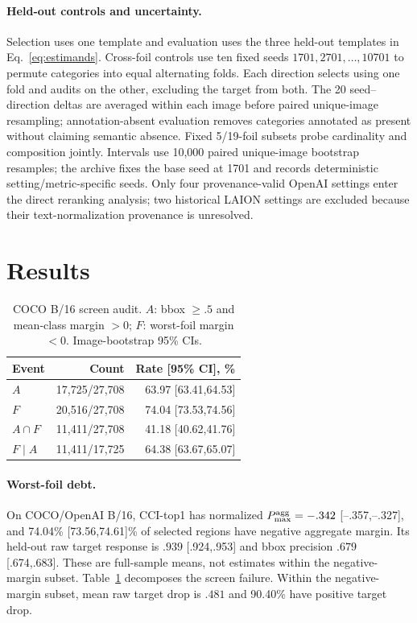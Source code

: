 \documentclass[10pt]{article}
\begin{document}
\paragraph{Held-out controls and uncertainty.}
Selection uses one template and evaluation uses the three held-out templates in
Eq.~\ref{eq:estimands}. Cross-foil controls use ten fixed seeds
$1701,2701,\ldots,10701$ to permute categories into equal alternating folds.
Each direction selects using one fold and audits on the other, excluding the
target from both. The 20 seed--direction deltas are averaged within each image
before paired unique-image resampling;
annotation-absent evaluation removes categories annotated as present without
claiming semantic absence. Fixed 5/19-foil subsets probe cardinality and composition jointly.
Intervals use 10,000 paired unique-image bootstrap resamples; the archive fixes
the base seed at 1701 and records deterministic setting/metric-specific seeds.
Only four provenance-valid OpenAI settings enter the direct reranking analysis;
two historical LAION settings are excluded because their text-normalization
provenance is unresolved.


\section{Results}
\begin{table}[!h]
\centering
\caption{COCO B/16 screen audit. $A$: bbox $\ge .5$ and mean-class margin $>0$; $F$: worst-foil margin $<0$. Image-bootstrap 95\% CIs.}
\label{tab:screens}
\small
\setlength{\tabcolsep}{3.0pt}
\renewcommand{\arraystretch}{1.04}
\begin{tabular*}{\columnwidth}{@{\extracolsep{\fill}}lrr@{}}
\toprule
Event & Count & Rate [95\% CI], \%\\
\midrule
$A$ & 17,725/27,708 & 63.97 [63.41,64.53]\\
$F$ & 20,516/27,708 & 74.04 [73.53,74.56]\\
$A\cap F$ & 11,411/27,708 & 41.18 [40.62,41.76]\\
$F\mid A$ & 11,411/17,725 & 64.38 [63.67,65.07]\\
\bottomrule
\end{tabular*}
\end{table}
\paragraph{Worst-foil debt.}
On COCO/OpenAI B/16, CCI-top1 has normalized
$P_{\max}^{\rm agg}=-.342$ [--.357,--.327], and 74.04\% [73.56,74.61]\% of
selected regions have negative aggregate margin. Its held-out raw target
response is $.939$ [.924,.953] and bbox precision $.679$ [.674,.683].
These are full-sample means, not estimates within the negative-margin subset.
Table~\ref{tab:screens} decomposes the screen failure. Within the negative-margin
subset, mean raw target drop is $.481$ and 90.40\% have positive target drop.
\end{document}
